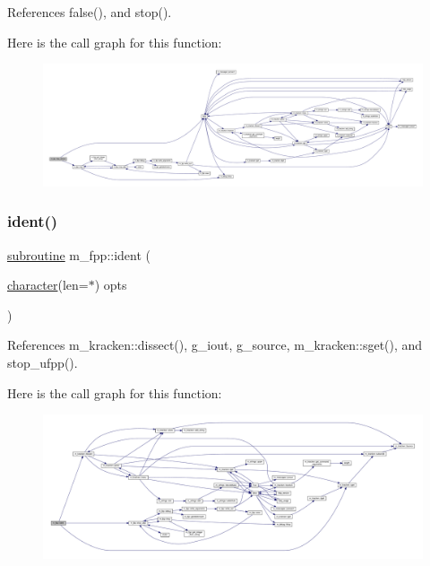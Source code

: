 References false(), and stop().

Here is the call graph for this function\+:
\nopagebreak
\begin{figure}[H]
\begin{center}
\leavevmode
\includegraphics[width=350pt]{namespacem__fpp_a7a571f61ee26c2a637c1530d2271ab23_cgraph}
\end{center}
\end{figure}
\mbox{\label{namespacem__fpp_afe91155aa0c891fc35f3927e777440ea}} 
\subsubsection{\texorpdfstring{ident()}{ident()}}
{\footnotesize\ttfamily \hyperlink{M__stopwatch_83_8txt_acfbcff50169d691ff02d4a123ed70482}{subroutine} m\+\_\+fpp\+::ident (\begin{DoxyParamCaption}\item[{\hyperlink{option__stopwatch_83_8txt_abd4b21fbbd175834027b5224bfe97e66}{character}(len=$\ast$)}]{opts }\end{DoxyParamCaption})}



References m\+\_\+kracken\+::dissect(), g\+\_\+iout, g\+\_\+source, m\+\_\+kracken\+::sget(), and stop\+\_\+ufpp().

Here is the call graph for this function\+:
\nopagebreak
\begin{figure}[H]
\begin{center}
\leavevmode
\includegraphics[width=350pt]{namespacem__fpp_afe91155aa0c891fc35f3927e777440ea_cgraph}
\end{center}
\end{figure}
\mbox{\label{namespacem__fpp_a4866adfbe17fb5cc245f2ad058bb47f2}} 

